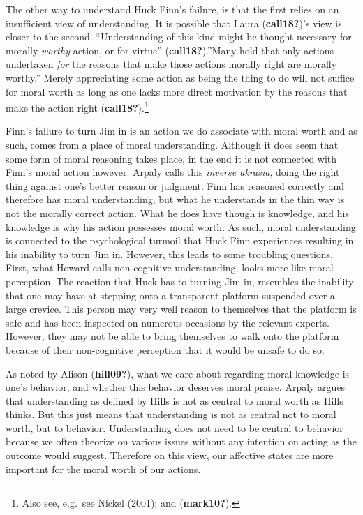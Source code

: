 \documentclass[12pt]{book}
\theoremstyle{definition}
\theoremstyle{remark}
\begin{document}
The other way to understand Huck Finn's failure, is that the first relies on an insufficient view of understanding. It is possible that Laura (\textbf{call18?})'s view is closer to the second. ``Understanding of this kind might be thought necessary for morally \emph{worthy} action, or for virtue'' (\textbf{call18?}).''Many hold that only actions undertaken \emph{for} the reasons that make those actions morally right are morally worthy.'' Merely appreciating some action as being the thing to do will not suffice for moral worth as long as one lacks more direct motivation by the reasons that make the action right (\textbf{call18?}).\footnote{Also see, e.g.~see Nickel (2001); and (\textbf{mark10?}).}

Finn's failure to turn Jim in is an action we do associate with moral worth and as such, comes from a place of moral understanding. Although it does seem that some form of moral reasoning takes place, in the end it is not connected with Finn's moral action however. Arpaly calls this \emph{inverse akrasia}, doing the right thing against one's better reason or judgment. Finn has reasoned correctly and therefore has moral understanding, but what he understands in the thin way is not the morally correct action. What he does have though is knowledge, and his knowledge is why his action possesses moral worth. As such, moral understanding is connected to the psychological turmoil that Huck Finn experiences resulting in his inability to turn Jim in. However, this leads to some troubling questions. First, what Howard calls non-cognitive understanding, looks more like moral perception. The reaction that Huck has to turning Jim in, resembles the inability that one may have at stepping onto a transparent platform suspended over a large crevice. This person may very well reason to themselves that the platform is safe and has been inspected on numerous occasions by the relevant experts. However, they may not be able to bring themselves to walk onto the platform because of their non-cognitive perception that it would be unsafe to do so.

As noted by Alison (\textbf{hill09?}), what we care about regarding moral knowledge is one's behavior, and whether this behavior deserves moral praise. Arpaly argues that understanding as defined by Hills is not as central to moral worth as Hills thinks. But this just means that understanding is not as central not to moral worth, but to behavior. Understanding does not need to be central to behavior because we often theorize on various issues without any intention on acting as the outcome would suggest. Therefore on this view, our affective states are more important for the moral worth of our actions.
\end{document}
